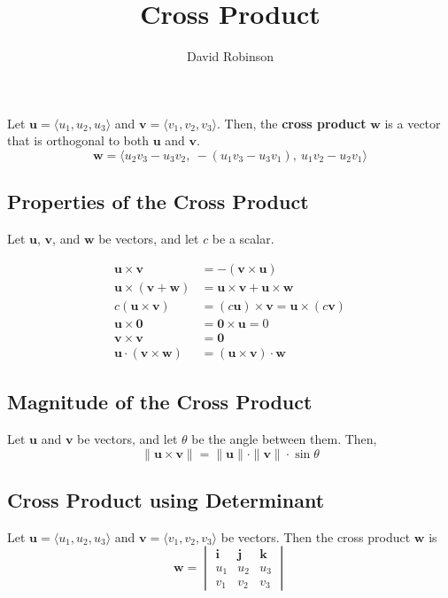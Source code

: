 \documentclass{article}
\title{Cross Product}
\author{David Robinson}
\date{}
\begin{document}
\maketitle

Let $\mathbf{u}=\langle u_1, u_2, u_3 \rangle$ and $\mathbf{v}=\langle v_1, v_2, v_3\rangle$. Then, the \textbf{cross product} $\mathbf{w}$ is a vector that is orthogonal to both $\mathbf{u}$ and $\mathbf{v}$.
\[\mathbf{w} = \langle u_2 v_3 - u_3 v_2,\: -(u_1 v_3 - u_3 v_1),\: u_1 v_2 - u_2 v_1 \rangle\]

\subsection*{Properties of the Cross Product}
Let $\mathbf{u}$, $\mathbf{v}$, and $\mathbf{w}$ be vectors, and let $c$ be a scalar.

\[
\begin{aligned}
    \mathbf{u}\times\mathbf{v} & = -(\mathbf{v}\times\mathbf{u}) \\[5pt]
    \mathbf{u}\times (\mathbf{v}+\mathbf{w}) & = \mathbf{u}\times\mathbf{v} + \mathbf{u}\times\mathbf{w} \\[5pt]
    c (\mathbf{u}\times\mathbf{v}) & = (c\mathbf{u})\times\mathbf{v} = \mathbf{u}\times (c\mathbf{v}) \\[5pt]
    \mathbf{u}\times\mathbf{0} & = \mathbf{0}\times\mathbf{u} = 0 \\[5pt]
    \mathbf{v}\times\mathbf{v} & = \mathbf{0} \\[5pt]
    \mathbf{u}\cdot (\mathbf{v}\times\mathbf{w}) & = (\mathbf{u}\times\mathbf{v})\cdot\mathbf{w}
\end{aligned}
\]

\subsection*{Magnitude of the Cross Product}
Let $\mathbf{u}$ and $\mathbf{v}$ be vectors, and let $\theta$ be the angle between them. Then,
\[\|\mathbf{u}\times\mathbf{v}\| = \|\mathbf{u}\|\cdot\|\mathbf{v}\|\cdot\sin\theta\]

\subsection*{Cross Product using Determinant}
Let $\mathbf{u}=\langle u_1, u_2, u_3 \rangle$ and $\mathbf{v}=\langle v_1, v_2, v_3 \rangle$ be vectors. Then the cross product $\mathbf{w}$ is
\[\mathbf{w}=\begin{vmatrix}
\mathbf{i} & \mathbf{j} & \mathbf{k} \\
u_1 & u_2 & u_3 \\
v_1 & v_2 & v_3
\end{vmatrix}\]
\end{document}
